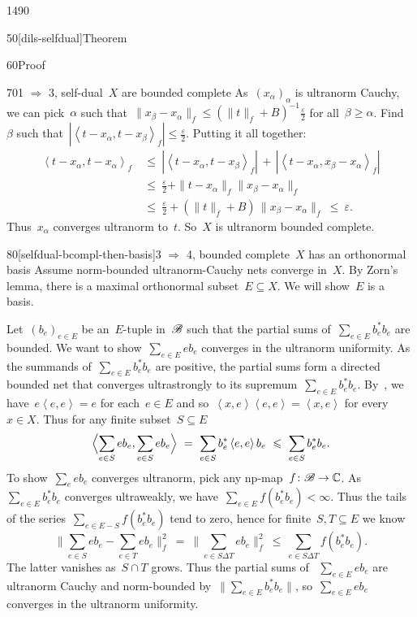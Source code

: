 \begin{parsec}{1490}
\begin{point}{50}[dils-selfdual]{Theorem}
\begin{point}{60}{Proof}
\begin{point}{70}{1 $\Rightarrow$ 3, self-dual~$X$ are bounded complete}
As~$(x_\alpha)_\alpha$ is ultranorm Cauchy,
we can pick~$\alpha$ such that~$\|x_\beta - x_\alpha\|_f \leq (\|t\|_f + B)^{-1}
\frac{\varepsilon}{2}$ for all~$\beta \geq \alpha$.
Find~$\beta$ such that~$|\left<t-x_\alpha,t-x_\beta\right>_f|
    \leq \frac{\varepsilon}{2}$.
Putting it all together:
\begin{align*}
    \left<t-x_\alpha,t-x_\alpha\right>_f
    & \ \leq\  |\left<t-x_\alpha,t-x_\beta\right>_f| \,
    +\, |\left<t-x_\alpha,x_\beta-x_\alpha\right>_f| \\
    & \ \leq\  \frac{\varepsilon}{2}
    + \| t- x_\alpha \|_f \|x_\beta - x_\alpha\|_f\\
    & \ \leq\  \frac{\varepsilon}{2}
    + (\| t\|_f + B) \,\|x_\beta - x_\alpha\|_f \ \leq\  \varepsilon.
\end{align*}
Thus~$x_\alpha$ converges ultranorm to~$t$.
So~$X$ is ultranorm bounded complete.
\end{point}
\begin{point}{80}[selfdual-bcompl-then-basis]{3
    $\Rightarrow$ 4, bounded complete~$X$ has an orthonormal basis}
    Assume norm-bounded ultranorm-Cauchy nets converge in~$X$.
By Zorn's lemma, there is a maximal orthonormal subset~$E \subseteq X$.
We will show~$E$ is a basis.

Let~$(b_e)_{e \in E}$ be an~$E$-tuple in~$\scrB$
such that the partial sums of~$\sum_{e \in E} b_e^*b_e$ are bounded.
We want to show~$\sum_{e \in E} e b_e$ converges in the ultranorm
    uniformity.
As the summands of~$\sum_{e \in E}b_e^*b_e$ are positive,
    the partial sums form a directed bounded net
    that converges ultrastrongly
    to its supremum~$\sum_{e \in E} b_e^*b_e$.
By~,
    we have~$e \left<e,e\right> = e$ for each~$e \in E$
    and so~$\left<x,e\right>\left<e,e\right> = \left<x,e\right>$
    for every~$x \in X$.
Thus for any finite subset~$S \subseteq E$
\begin{equation*}
    \Bigl<\sum_{e \in S} eb_e, \sum_{e \in S} eb_e\Bigr>
    \ =\  \sum_{e \in S} b_e^* \left<e,e\right>b_e
    \ \leq\  \sum_{e \in S} b_e^*b_e.
\end{equation*}
To show~$\sum_e eb_e$ converges ultranorm,
    pick any np-map~$f\colon \scrB \to \C$.
As~$\sum_{e \in E} b^*_eb_e$ converges ultraweakly,
we have~$\sum_{e \in E} f(b^*_eb_e) < \infty$.
Thus the tails of the series~$\sum_{e \in E - S} f(b_e^*b_e)$ tend to zero, hence for finite~$S,T\subseteq E$ we know
\begin{equation*}
    \bigl\| \sum_{e \in S} eb_e - \sum_{e\in T} eb_e \bigr\|_f^2
        \ =\  \bigl\| \sum_{e \in S\Delta T} eb_e  \bigr\|_f^2
        \ \leq \ \sum_{e \in S\Delta T} f(b_e^*b_e).
\end{equation*}
The latter vanishes as~$S \cap T$ grows.
Thus the partial sums of ~$\sum_{e \in E} eb_e$ are ultranorm Cauchy
and norm-bounded by~$\| \sum_{e \in E} b_e^*b_e \|$,
so~$\sum_{e \in E} eb_e$ converges in the ultranorm uniformity.


\end{point}
\end{point}
\end{point}
\end{parsec}
